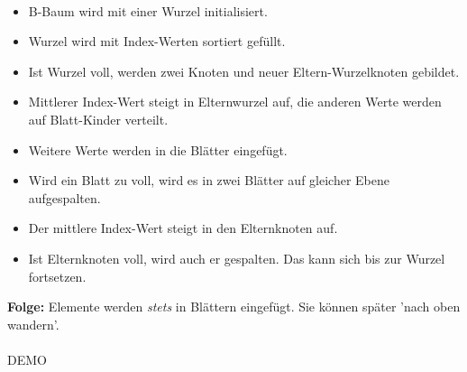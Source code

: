\begin{frame}{\insertsection}
\framesubtitle{\insertsubsection}
\begin{itemize}
	\item B-Baum wird mit einer Wurzel initialisiert.\pause
	\item Wurzel wird mit Index-Werten sortiert gef\"ullt. \pause
	\item Ist Wurzel voll, werden zwei Knoten und neuer Eltern-Wurzelknoten gebildet.\pause
	\item Mittlerer Index-Wert steigt in Elternwurzel auf, die anderen Werte werden auf Blatt-Kinder verteilt.\pause
	\item Weitere Werte werden in die Bl\"atter eingef\"ugt.\pause 
	\item Wird ein Blatt zu voll, wird es in zwei Blätter auf gleicher Ebene aufgespalten.\pause
	\item Der mittlere Index-Wert steigt in den Elternknoten auf.\pause 
	\item Ist Elternknoten voll, wird auch er gespalten. Das kann sich bis zur Wurzel fortsetzen.\pause 
\end{itemize}
\abs
\textbf{Folge:} Elemente werden \textit{stets} in Blättern eingefügt. Sie k\"onnen sp\"ater 'nach oben wandern'.
\end{frame}

\begin{frame}{\insertsection}
\framesubtitle{\insertsubsection}
\begin{center}
{\Huge DEMO}
\end{center}
\end{frame}

